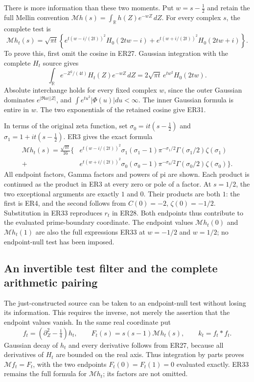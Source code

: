 There is more information than these two moments. Put
\(w=s-\tfrac12\) and retain the full Mellin convention
\(\mathcal M h(s)=\int_{\mathbb R}h(Z)e^{-wZ}\,dZ\).
For every complex \(s\), the complete test is
\[
 \mathcal M h_t(s)=\sqrt{\pi t}
 \left\{e^{t(w-i/(2t))^2}H_0(2tw-i)
       +e^{t(w+i/(2t))^2}H_0(2tw+i)\right\}.
 \tag{ER31}
\]
To prove this, first omit the cosine in ER27. Gaussian integration
with the complete \(H_t\) source gives
\[
 \int_{\mathbb R}e^{-Z^2/(4t)}H_t(Z)e^{-wZ}\,dZ
        =2\sqrt{\pi t}\,e^{tw^2}H_0(2tw).
 \tag{ER32}
\]
Absolute interchange holds for every fixed complex \(w\), since
the outer Gaussian dominates \(e^{|\Re w||Z|}\), and
\(\int e^{tu^2}|\Phi(u)|du<\infty\).
The inner Gaussian formula is entire in \(w\).
The two exponentials of the retained cosine give ER31.

In terms of the original zeta function, set
\(\sigma_0=it(s-\tfrac12)\) and
\(\sigma_1=1+it(s-\tfrac12)\). ER3 gives the exact formula
\[
 \boxed{\begin{aligned}
 \mathcal M h_t(s)=\frac{\sqrt{\pi t}}{16}\big\{&
 e^{t(w-i/(2t))^2}
 \sigma_1(\sigma_1-1)\pi^{-\sigma_1/2}
       \Gamma(\sigma_1/2)\zeta(\sigma_1)\\
 {}+{}&
 e^{t(w+i/(2t))^2}
 \sigma_0(\sigma_0-1)\pi^{-\sigma_0/2}
       \Gamma(\sigma_0/2)\zeta(\sigma_0)\big\}.
 \end{aligned}}
 \tag{ER33}
\]
All endpoint factors, Gamma factors and powers of pi are shown.
Each product is continued as the product in ER3 at every zero or
pole of a factor. At \(s=1/2\), the two exceptional arguments are
exactly \(1\) and \(0\). Their products are both \(1\):
the first is ER4, and the second follows from
\(C(0)=-2\), \(\zeta(0)=-1/2\).
Substitution in ER33 reproduces \(r_t\) in ER28.
Both endpoints thus contribute to the evaluated prime-boundary
coordinate. The endpoint values \(\mathcal M h_t(0)\) and
\(\mathcal M h_t(1)\) are also the full expressions ER33 at
\(w=-1/2\) and \(w=1/2\); no endpoint-null test has been imposed.

\subsection{An invertible test filter and the complete arithmetic pairing}

The just-constructed source can be taken to an endpoint-null test
without losing its information. This requires the inverse, not merely
the assertion that the endpoint values vanish. In the same real
coordinate put
\[
 f_t=(\partial_Z^2-\tfrac14)h_t,\qquad
 F_t(s)=s(s-1)\mathcal M h_t(s),\qquad
 k_t=f_t*f_t .
 \tag{ER34}
\]
Gaussian decay of \(h_t\) and every derivative follows from ER27,
because all derivatives of \(H_t\) are bounded on the real axis.
Thus integration by parts proves
\(\mathcal M f_t=F_t\), with the two endpoints
\(F_t(0)=F_t(1)=0\) evaluated exactly. ER33 remains the full
formula for \(\mathcal M h_t\); its factors are not omitted.

